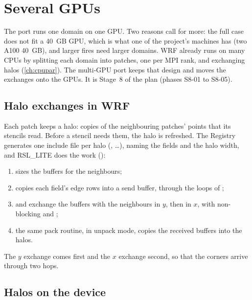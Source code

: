 \chapter{Several GPUs}\label{ch:mgpu}

The port runs one domain on one GPU. Two reasons call for more: the full case does not fit a 40~GB GPU, which is what one of
the project's machines has (two A100 40~GB), and larger fires need larger domains. WRF already runs on many CPUs
by splitting each domain into patches, one per MPI rank, and exchanging halos (\cref{ch:cpupar}). The multi-GPU port
keeps that design and moves the exchanges onto the GPUs. It is Stage~8 of the plan (phases S8-01 to S8-05).

\section{Halo exchanges in WRF}

Each patch keeps a halo: copies of the neighbouring patches' points that its stencils read. Before a stencil needs
them, the halo is refreshed. The Registry generates one include file per halo (, \dots), naming the
fields and the halo width, and RSL\_LITE does the work ():
\begin{enumerate}
  \item {} sizes the buffers for the neighbours;
  \item {} copies each field's edge rows into a send buffer, through the loops of ;
  \item {} and  exchange the buffers with the neighbours in $y$, then in
    $x$, with non-blocking  and ;
  \item the same pack routine, in unpack mode, copies the received buffers into the halos.
\end{enumerate}
The $y$ exchange comes first and the $x$ exchange second, so that the corners arrive through two hops.

\section{Halos on the device}

